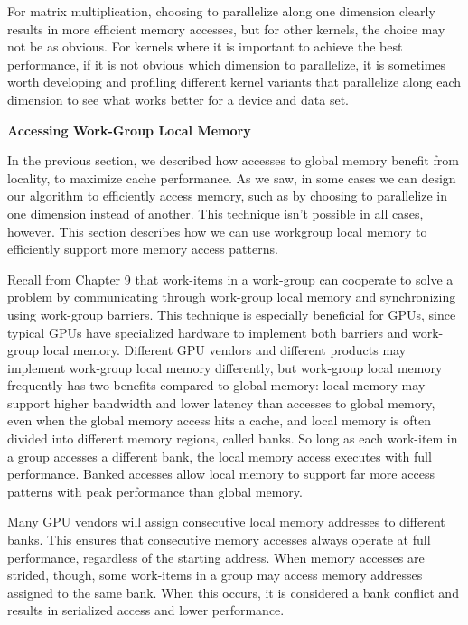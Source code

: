 \begin{tcolorbox}[colback=blue!5!white,colframe=blue!75!black, title=PROFILING KERNEL VARIANTS]
For matrix multiplication, choosing to parallelize along one dimension clearly results in more efficient memory accesses, but for other kernels, the choice may not be as obvious. For kernels where it is important to achieve the best performance, if it is not obvious which dimension to parallelize, it is sometimes worth developing and profiling different kernel variants that parallelize along each dimension to see what works better for a device and data set.
\end{tcolorbox}

\hspace*{\fill} \par %
\textbf{Accessing Work-Group Local Memory}

In the previous section, we described how accesses to global memory benefit from locality, to maximize cache performance. As we saw, in some cases we can design our algorithm to efficiently access memory, such as by choosing to parallelize in one dimension instead of another. This technique isn’t possible in all cases, however. This section describes how we can use workgroup local memory to efficiently support more memory access patterns.\par

Recall from Chapter 9 that work-items in a work-group can cooperate to solve a problem by communicating through work-group local memory and synchronizing using work-group barriers. This technique is especially beneficial for GPUs, since typical GPUs have specialized hardware to implement both barriers and work-group local memory. Different GPU vendors and different products may implement work-group local memory differently, but work-group local memory frequently has two benefits compared to global memory: local memory may support higher bandwidth and lower latency than accesses to global memory, even when the global memory access hits a cache, and local memory is often divided into different memory regions, called banks. So long as each work-item in a group accesses a different bank, the local memory access executes with full performance. Banked accesses allow local memory to support far more access patterns with peak performance than global memory.\par

Many GPU vendors will assign consecutive local memory addresses to different banks. This ensures that consecutive memory accesses always operate at full performance, regardless of the starting address. When memory accesses are strided, though, some work-items in a group may access memory addresses assigned to the same bank. When this occurs, it is considered a bank conflict and results in serialized access and lower performance.\par


